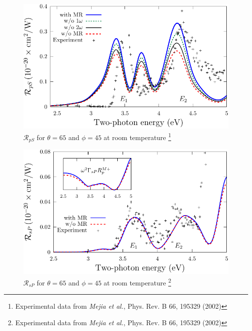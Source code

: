 \documentclass{beamer}
\begin{document}
\begin{frame}
\begin{figure}
\centering
\includegraphics[width=\textwidth]{fig-Si1x1-Mejia_RpS}
\caption{$\mathcal{R}_{pS}$ for $\theta=65$ and $\phi=45$ at room temperature%
\footnote{Experimental data from \emph{Mejia et al.}, Phys. Rev. B 66, 195329 (2002)}}
\end{figure}
\end{frame}

\begin{frame}
\begin{figure}
\centering
\includegraphics[width=\textwidth]{fig-Si1x1-Mejia_RsP}
\caption{$\mathcal{R}_{sP}$ for $\theta=65$ and $\phi=45$ at room temperature%
\footnote{Experimental data from \emph{Mejia et al.}, Phys. Rev. B 66, 195329 (2002)}}
\end{figure}
\end{frame}
\end{document}
